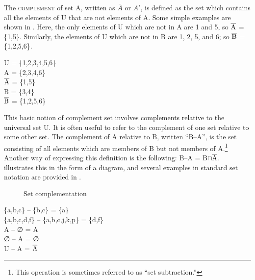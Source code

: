 The \textsc{complement} of set A, written as $\overline{A}$ or $A'$, is defined as the set which contains all the elements of U that are not elements of A. Some simple examples are shown in . Here, the only elements of U which are not in A are 1 and 5, so
$\overline{\textnormal{A}}$ = \{1,5\}. Similarly, the elements of U which are not in B are 1, 2, 5, and 6; so $\overline{\textnormal{B}}$ = \{1,2,5,6\}.


\ea \label{ex:13.17}
U = \{1,2,3,4,5,6\}\\
A = \{2,3,4,6\}\\
$\overline{\textnormal{A}}$ = \{1,5\}\\
B = \{3,4\}\\
$\overline{\textnormal{B}}$ = \{1,2,5,6\}
\z


This basic notion of complement set involves complements relative to the universal set U. It is often useful to refer to the complement of one set relative to some other set. The complement of A relative to B, written “B–A”, is the set consisting of all elements which are members of B but not members of A.\footnote{This operation is sometimes referred to as “set subtraction.”} Another way of expressing this definition is the following: B–A = B${\cap}\overline{\textnormal{A}}$.  illustrates this in the form of a diagram, and several examples in standard set notation are provided in .

\begin{figure}
\caption{\label{fig:13:4} Set complementation}
\end{figure}

\ea \label{ex:13.18}
\{a,b,c\} – \{b,c\} = \{a\}\\
\{a,b,c,d,f\} – \{a,b,c,j,k,p\} = \{d,f\}\\
A – ∅ = A\\
∅ – A = ∅\\
U – A = $\overline{\textnormal{A}}$
\z


